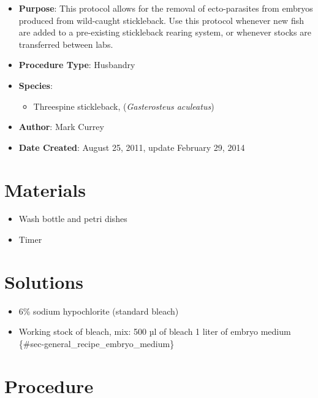 \documentclass[
  letterpaper,
  DIV=11,
  numbers=noendperiod]{scrreprt}
\providecommand{\tightlist}{%
  \setlength{\itemsep}{0pt}\setlength{\parskip}{0pt}}\usepackage{longtable,booktabs,array}
\begin{document}
\begin{itemize}
\tightlist
\item
  \textbf{Purpose}: This protocol allows for the removal of
  ecto-parasites from embryos produced from wild-caught stickleback. Use
  this protocol whenever new fish are added to a pre-existing
  stickleback rearing system, or whenever stocks are transferred between
  labs.
\item
  \textbf{Procedure Type}: Husbandry
\item
  \textbf{Species}:

  \begin{itemize}
  \tightlist
  \item
    Threespine stickleback, (\emph{Gasterosteus aculeatus})
  \end{itemize}
\item
  \textbf{Author}: Mark Currey\\
\item
  \textbf{Date Created}: August 25, 2011, update February 29, 2014
\end{itemize}

\hypertarget{materials-52}{%
\section{Materials}\label{materials-52}}

\begin{itemize}
\tightlist
\item
  Wash bottle and petri dishes
\item
  Timer
\end{itemize}

\hypertarget{solutions-43}{%
\section{Solutions}\label{solutions-43}}

\begin{itemize}
\tightlist
\item
  6\% sodium hypochlorite (standard bleach)
\item
  Working stock of bleach, mix: 500 µl of bleach 1 liter of embryo
  medium \{\#sec-general\_recipe\_embryo\_medium\}
\end{itemize}

\hypertarget{procedure-52}{%
\section{Procedure}\label{procedure-52}}
\end{document}
